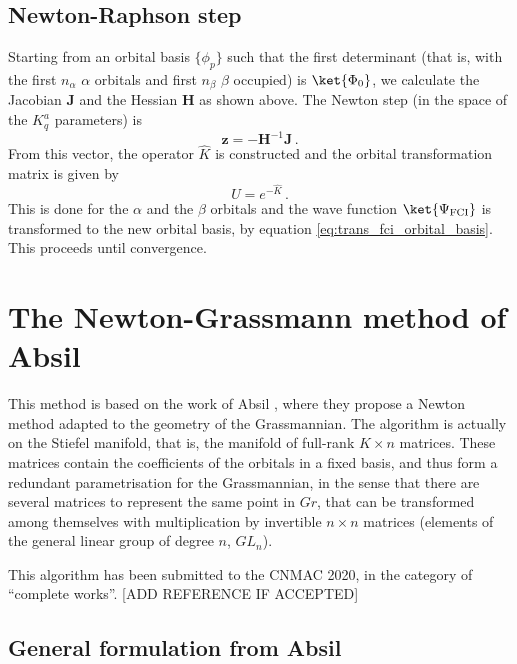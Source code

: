 \documentclass[a4paper,11pt]{article}
\begin{document}
\subsection{Newton-Raphson step}
Starting from an orbital basis $\{\phi_p\}$ such that the first determinant (that is, with the first $n_\alpha$ $\alpha$ orbitals and first $n_\beta$ $\beta$ occupied) is $\ket{\Phi_0}$, we calculate the Jacobian $\mathbf{J}$ and the Hessian $\mathbf{H}$ as shown above.
The Newton step (in the space of the $K_q^a$ parameters) is
\begin{equation}
  \mathbf{z} = -\mathbf{H}^{-1} \mathbf{J}\,.
\end{equation}
From this vector, the operator $\hat{K}$ is constructed and the orbital transformation matrix is given by
\begin{equation}
  U = e^{-\hat{K}}\,.
\end{equation}
This is done for the $\alpha$ and the $\beta$ orbitals and the wave function $\ket{\Psi_\text{FCI}}$ is transformed to the new orbital basis, by equation \eqref{eq:trans_fci_orbital_basis}.
This proceeds until convergence.


\newpage
\section{The Newton-Grassmann method of Absil}

This method is based on the work of Absil \etal{}, where they propose a Newton method adapted to the geometry of the Grassmannian.
The algorithm is actually on the Stiefel manifold, that is, the manifold of full-rank $K \times n$ matrices.
These matrices contain the coefficients of the orbitals in a fixed basis, and thus form a redundant parametrisation for the Grassmannian, in the sense that there are several matrices to represent the same point in $Gr$, that can be transformed among themselves with multiplication by invertible $n \times n$ matrices (elements of the general linear group of degree $n$, $GL_n$).

This algorithm has been submitted to the CNMAC 2020, in the category of ``complete works''. [ADD REFERENCE IF ACCEPTED]

\subsection{General formulation from Absil}
\end{document}
